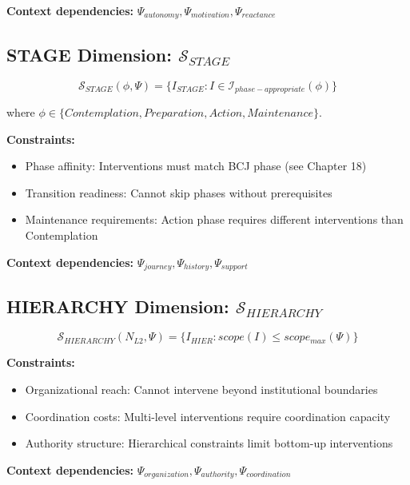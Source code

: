 \textbf{Context dependencies:} $\Psi_{autonomy}, \Psi_{motivation}, \Psi_{reactance}$

\subsection{STAGE Dimension: $\mathcal{S}_{STAGE}$}

\begin{equation}
\mathcal{S}_{STAGE}(\phi, \Psi) = \{I_{STAGE} : I \in \mathcal{I}_{phase-appropriate}(\phi)\}
\end{equation}

where $\phi \in \{Contemplation, Preparation, Action, Maintenance\}$.

\textbf{Constraints:}
\begin{itemize}
    \item Phase affinity: Interventions must match BCJ phase (see Chapter 18)
    \item Transition readiness: Cannot skip phases without prerequisites
    \item Maintenance requirements: Action phase requires different interventions than Contemplation
\end{itemize}

\textbf{Context dependencies:} $\Psi_{journey}, \Psi_{history}, \Psi_{support}$

\subsection{HIERARCHY Dimension: $\mathcal{S}_{HIERARCHY}$}

\begin{equation}
\mathcal{S}_{HIERARCHY}(N_{L2}, \Psi) = \{I_{HIER} : scope(I) \leq scope_{max}(\Psi)\}
\end{equation}

\textbf{Constraints:}
\begin{itemize}
    \item Organizational reach: Cannot intervene beyond institutional boundaries
    \item Coordination costs: Multi-level interventions require coordination capacity
    \item Authority structure: Hierarchical constraints limit bottom-up interventions
\end{itemize}

\textbf{Context dependencies:} $\Psi_{organization}, \Psi_{authority}, \Psi_{coordination}$

